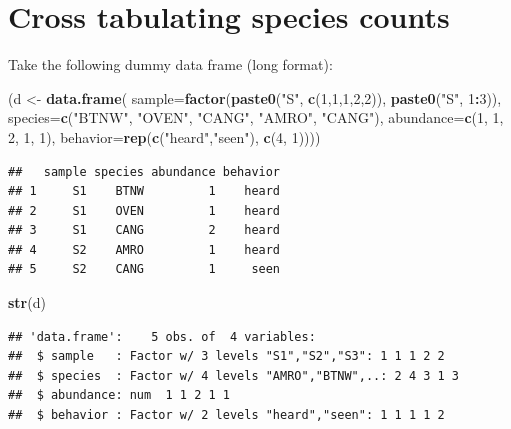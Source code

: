 \documentclass[12pt,]{scrbook}
\newenvironment{Shaded}{\begin{snugshade}}{\end{snugshade}}
\newcommand{\DataTypeTok}[1]{\textcolor[rgb]{0.13,0.29,0.53}{#1}}
\newcommand{\DecValTok}[1]{\textcolor[rgb]{0.00,0.00,0.81}{#1}}
\newcommand{\KeywordTok}[1]{\textcolor[rgb]{0.13,0.29,0.53}{\textbf{#1}}}
\newcommand{\NormalTok}[1]{#1}
\newcommand{\OperatorTok}[1]{\textcolor[rgb]{0.81,0.36,0.00}{\textbf{#1}}}
\newcommand{\StringTok}[1]{\textcolor[rgb]{0.31,0.60,0.02}{#1}}
\begin{document}
\hypertarget{cross-tabulating-species-counts}{%
\section{Cross tabulating species counts}\label{cross-tabulating-species-counts}}

Take the following dummy data frame (long format):

\begin{Shaded}
\begin{Highlighting}[]
\NormalTok{(d <-}\StringTok{ }\KeywordTok{data.frame}\NormalTok{(}
  \DataTypeTok{sample=}\KeywordTok{factor}\NormalTok{(}\KeywordTok{paste0}\NormalTok{(}\StringTok{"S"}\NormalTok{, }\KeywordTok{c}\NormalTok{(}\DecValTok{1}\NormalTok{,}\DecValTok{1}\NormalTok{,}\DecValTok{1}\NormalTok{,}\DecValTok{2}\NormalTok{,}\DecValTok{2}\NormalTok{)), }\KeywordTok{paste0}\NormalTok{(}\StringTok{"S"}\NormalTok{, }\DecValTok{1}\OperatorTok{:}\DecValTok{3}\NormalTok{)),}
  \DataTypeTok{species=}\KeywordTok{c}\NormalTok{(}\StringTok{"BTNW"}\NormalTok{, }\StringTok{"OVEN"}\NormalTok{, }\StringTok{"CANG"}\NormalTok{, }\StringTok{"AMRO"}\NormalTok{, }\StringTok{"CANG"}\NormalTok{),}
  \DataTypeTok{abundance=}\KeywordTok{c}\NormalTok{(}\DecValTok{1}\NormalTok{, }\DecValTok{1}\NormalTok{, }\DecValTok{2}\NormalTok{, }\DecValTok{1}\NormalTok{, }\DecValTok{1}\NormalTok{),}
  \DataTypeTok{behavior=}\KeywordTok{rep}\NormalTok{(}\KeywordTok{c}\NormalTok{(}\StringTok{"heard"}\NormalTok{,}\StringTok{"seen"}\NormalTok{), }\KeywordTok{c}\NormalTok{(}\DecValTok{4}\NormalTok{, }\DecValTok{1}\NormalTok{))))}
\end{Highlighting}
\end{Shaded}

\begin{verbatim}
##   sample species abundance behavior
## 1     S1    BTNW         1    heard
## 2     S1    OVEN         1    heard
## 3     S1    CANG         2    heard
## 4     S2    AMRO         1    heard
## 5     S2    CANG         1     seen
\end{verbatim}

\begin{Shaded}
\begin{Highlighting}[]
\KeywordTok{str}\NormalTok{(d)}
\end{Highlighting}
\end{Shaded}

\begin{verbatim}
## 'data.frame':    5 obs. of  4 variables:
##  $ sample   : Factor w/ 3 levels "S1","S2","S3": 1 1 1 2 2
##  $ species  : Factor w/ 4 levels "AMRO","BTNW",..: 2 4 3 1 3
##  $ abundance: num  1 1 2 1 1
##  $ behavior : Factor w/ 2 levels "heard","seen": 1 1 1 1 2
\end{verbatim}
\end{document}
